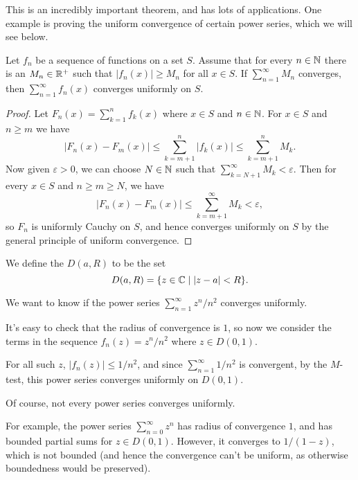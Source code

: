 \documentclass[a4paper]{scrartcl}
\begin{document}
This is an incredibly important theorem, and has lots of applications. One example is proving the uniform convergence of certain power series, which we will see below.

\begin{theorem}
    Let $f_n$ be a sequence of functions on a set $S$. Assume that for every $n \in \mathbb{N}$ there is an $M_n \in \mathbb{R}^+$ such that $|f_n(x)| \geq M_n$ for all $x \in S$. If $\sum_{n = 1}^{\infty} M_n$ converges, then $\sum_{n = 1}^{\infty} f_n(x)$ converges uniformly on $S$.
\end{theorem}
\begin{proof}
    Let $F_n(x) = \sum_{k = 1}^n f_k(x)$ where $x \in S$ and $n \in \mathbb{N}$.
    For $x \in S$ and $n \geq m$ we have
    $$
    |F_n(x) - F_m(x)| \leq \sum_{k = m + 1}^n |f_k(x)| \leq \sum_{k = m + 1}^n M_k.
    $$
    Now given $\varepsilon>0$, we can choose $N \in \mathbb{N}$ such that $\sum_{k = N + 1}^{\infty} M_k < \varepsilon$. Then for every $x \in S$ and $n \geq m \geq N$, we have
    $$
    |F_n(x) - F_m(x)| \leq \sum_{k = m + 1}^{\infty} M_k < \varepsilon,
    $$
    so $F_n$ is uniformly Cauchy on $S$, and hence converges uniformly on $S$ by the general principle of uniform convergence.
\end{proof}

\begin{definition}
    We define the  $D(a, R)$ to be the set 
    $$
    D(a, R) = \{ z \in \mathbb{C} \mid |z - a| < R \}.
    $$
\end{definition}

\begin{example}[Uniform Convergence of $\sum_{n = 1}^{\infty} z^n/n^2$]
    We want to know if the power series $\sum_{n = 1}^{\infty} z^n/n^2$ converges uniformly.

    It's easy to check that the radius of convergence is $1$, so now we consider the terms in the sequence $f_n(z) = z^n/n^2$ where $z \in D(0, 1)$.

    For all such $z$, $|f_n(z)| \leq 1/n^2$, and since $\sum_{n = 1}^{\infty} 1/n^2$ is convergent, by the $M$-test, this power series converges uniformly on $D(0, 1)$.
\end{example}

Of course, not every power series converges uniformly. 

For example, the power series $\sum_{n = 0}^{\infty} z^n$ has radius of convergence $1$, and has bounded partial sums for $z \in D(0, 1)$. However, it converges to $1/(1 - z)$, which is not bounded (and hence the convergence can't be uniform, as otherwise boundedness would be preserved).
\end{document}
